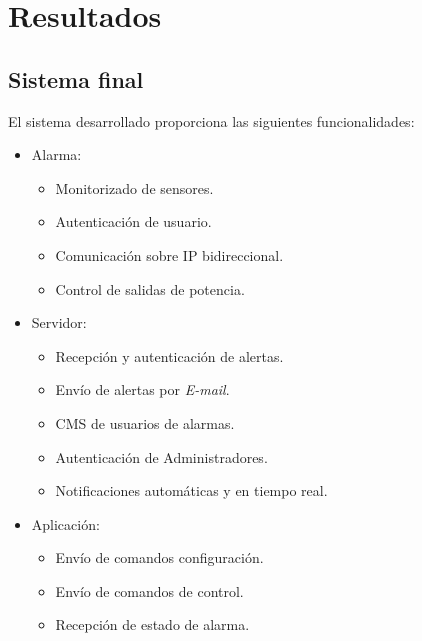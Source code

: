 
\chapter{Resultados} %

\label{Chapter5} %



\section{Sistema final}

El sistema desarrollado proporciona las siguientes funcionalidades:

\begin{itemize}
\item Alarma:
	\begin{itemize}
	\item Monitorizado de sensores.
	\item Autenticación de usuario.
	\item Comunicación sobre IP bidireccional.
	\item Control de salidas de potencia.
	\end{itemize}
\item Servidor:
	\begin{itemize}
	\item Recepción y autenticación de alertas.
	\item Envío de alertas por \textit{E-mail}.
	\item CMS de usuarios de alarmas.
	\item Autenticación de Administradores.
	\item Notificaciones automáticas y en tiempo real.
	\end{itemize}
\item Aplicación:
	\begin{itemize}
	\item Envío de comandos configuración.
	\item Envío de comandos de control.
	\item Recepción de estado de alarma.
	\end{itemize}
\end{itemize}

